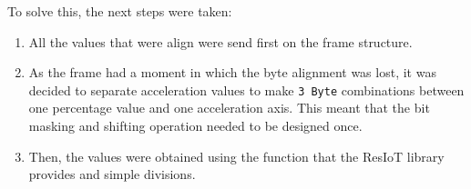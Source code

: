To solve this, the next steps were taken:
\begin{enumerate}
    \item All the values that were align were send first on the frame structure.
    \item As the frame had a moment in which the byte alignment was lost, it was decided to separate acceleration values to make \texttt{3 Byte} combinations between one percentage 
    value and one acceleration axis. This meant that the bit masking and shifting operation needed to be designed once.
    \item Then, the values were obtained using the function that the ResIoT library provides and simple divisions.
\end{enumerate}
